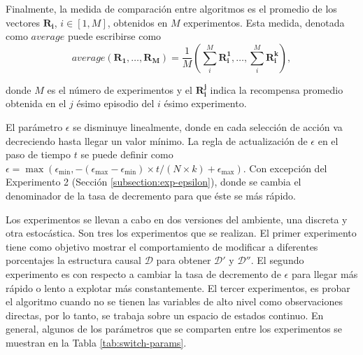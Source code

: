 Finalmente, la medida de comparación entre algoritmos es
el promedio de los vectores $\mathbf{R_i}$, $i\in [1, M]$,  obtenidos en $M$ experimentos. Esta medida, denotada como  $average$ puede escribirse como 
\begin{equation}
\label{eq:average}
average(\mathbf{R_1}, \dots, \mathbf{R_M}) = \frac{1}{M}(\sum^M_i \mathbf{R_{i}^1}, \dots, \sum^M_i\mathbf{R_{i}^k}),    
\end{equation}

donde $M$ es el número de experimentos y el $\mathbf{R_i^j}$ indica la recompensa promedio obtenida en el $j$ ésimo episodio del $i$ ésimo experimento.

El parámetro $\epsilon$ se disminuye linealmente, donde
en cada selección de acción va decreciendo hasta llegar
un valor mínimo. La regla de actualización de $\epsilon$ en
el paso de tiempo $t$ se puede definir como $\epsilon = \max(\epsilon_{\min}, -(\epsilon_{\max} - \epsilon_{\min}) \times t/ (N \times k) + \epsilon_{\max})$. Con excepción
del Experimento 2 (Sección \ref{subsection:exp-epsilon}), donde se cambia el denominador de la
tasa de decremento para que éste se más rápido.

Los experimentos se llevan a cabo en dos versiones del ambiente, una discreta y otra estocástica. Son tres los experimentos que se realizan. El primer experimento tiene 
como objetivo mostrar el comportamiento de modificar a
diferentes porcentajes la estructura causal $\mathcal{D}$ para obtener $\mathcal{D'}$ y $\mathcal{D}''$. El segundo experimento es con respecto a cambiar la tasa de decremento
de $\epsilon$ para llegar más rápido o lento a explotar 
más constantemente. El tercer experimentos, es probar
el algoritmo cuando no se tienen las variables
de alto nivel como observaciones directas, por lo tanto,
se trabaja sobre un espacio de estados continuo. En general,
algunos de los parámetros que se comparten entre los experimentos se muestran en la Tabla \ref{tab:switch-params}.


